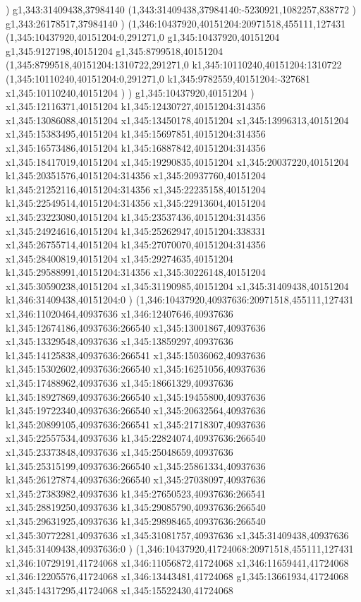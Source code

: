 {)
g1,343:31409438,37984140
(1,343:31409438,37984140:-5230921,1082257,838772
)
g1,343:26178517,37984140
)
(1,346:10437920,40151204:20971518,455111,127431
(1,345:10437920,40151204:0,291271,0
g1,345:10437920,40151204
g1,345:9127198,40151204
g1,345:8799518,40151204
(1,345:8799518,40151204:1310722,291271,0
k1,345:10110240,40151204:1310722
(1,345:10110240,40151204:0,291271,0
k1,345:9782559,40151204:-327681
x1,345:10110240,40151204
)
)
g1,345:10437920,40151204
)
x1,345:12116371,40151204
k1,345:12430727,40151204:314356
x1,345:13086088,40151204
x1,345:13450178,40151204
x1,345:13996313,40151204
x1,345:15383495,40151204
k1,345:15697851,40151204:314356
x1,345:16573486,40151204
k1,345:16887842,40151204:314356
x1,345:18417019,40151204
x1,345:19290835,40151204
x1,345:20037220,40151204
k1,345:20351576,40151204:314356
x1,345:20937760,40151204
k1,345:21252116,40151204:314356
x1,345:22235158,40151204
k1,345:22549514,40151204:314356
x1,345:22913604,40151204
x1,345:23223080,40151204
k1,345:23537436,40151204:314356
x1,345:24924616,40151204
k1,345:25262947,40151204:338331
x1,345:26755714,40151204
k1,345:27070070,40151204:314356
x1,345:28400819,40151204
x1,345:29274635,40151204
k1,345:29588991,40151204:314356
x1,345:30226148,40151204
x1,345:30590238,40151204
x1,345:31190985,40151204
x1,345:31409438,40151204
k1,346:31409438,40151204:0
)
(1,346:10437920,40937636:20971518,455111,127431
x1,346:11020464,40937636
x1,346:12407646,40937636
k1,345:12674186,40937636:266540
x1,345:13001867,40937636
x1,345:13329548,40937636
x1,345:13859297,40937636
k1,345:14125838,40937636:266541
x1,345:15036062,40937636
k1,345:15302602,40937636:266540
x1,345:16251056,40937636
x1,345:17488962,40937636
x1,345:18661329,40937636
k1,345:18927869,40937636:266540
x1,345:19455800,40937636
k1,345:19722340,40937636:266540
x1,345:20632564,40937636
k1,345:20899105,40937636:266541
x1,345:21718307,40937636
x1,345:22557534,40937636
k1,345:22824074,40937636:266540
x1,345:23373848,40937636
x1,345:25048659,40937636
k1,345:25315199,40937636:266540
x1,345:25861334,40937636
k1,345:26127874,40937636:266540
x1,345:27038097,40937636
x1,345:27383982,40937636
k1,345:27650523,40937636:266541
x1,345:28819250,40937636
k1,345:29085790,40937636:266540
x1,345:29631925,40937636
k1,345:29898465,40937636:266540
x1,345:30772281,40937636
x1,345:31081757,40937636
x1,345:31409438,40937636
k1,345:31409438,40937636:0
)
(1,346:10437920,41724068:20971518,455111,127431
x1,346:10729191,41724068
x1,346:11056872,41724068
x1,346:11659441,41724068
x1,346:12205576,41724068
x1,346:13443481,41724068
g1,345:13661934,41724068
x1,345:14317295,41724068
x1,345:15522430,41724068
}
